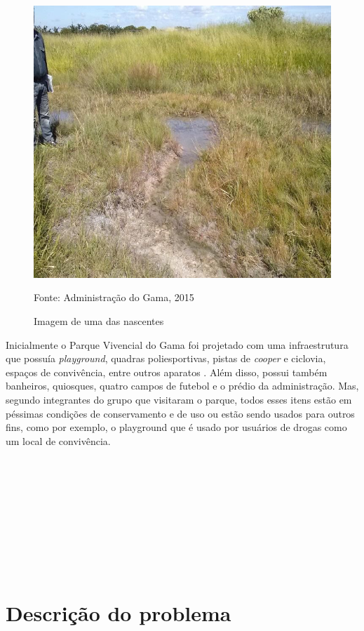 \begin{figure}[h]
	\centering
	\label{Imagem do Parque Vivencial do Gama}
		\includegraphics[keepaspectratio=true,scale=0.4]{figuras/Nascentes.jpg}
	\caption{Imagem de uma das nascentes}
	\small{Fonte: Administra\c{c}\~ao do Gama, 2015}
\end{figure}

Inicialmente o Parque Vivencial do Gama foi projetado com uma infraestrutura que possu\'ia \textit{playground}, quadras poliesportivas, pistas de \textit{cooper} e ciclovia, espa\c{c}os de conviv\^encia, entre outros aparatos \cite{Ibram}. Al\'em disso, possui tamb\'em banheiros, quiosques, quatro campos de futebol e o pr\'edio da administra\c{c}\~ao. Mas, segundo integrantes do grupo que visitaram o parque, todos esses itens est\~ao em p\'essimas condi\c{c}\~oes de conservamento e de uso ou est\~ao sendo usados para outros fins, como por exemplo, o playground que \'e usado por usu\'arios de drogas como um local de conviv\^encia. \\ \\ \\ \\ \\ \\ \\ \\ \\ \\

\section{Descri\c{c}\~ao do problema}

